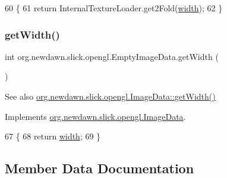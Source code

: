 \begin{DoxyCode}
60                              \{
61         \textcolor{keywordflow}{return} InternalTextureLoader.get2Fold(\mbox{\hyperlink{classorg_1_1newdawn_1_1slick_1_1opengl_1_1_empty_image_data_a0db414de2bae9de9483a7f3481c48b5e}{width}});
62     \}
\end{DoxyCode}
\mbox{\label{classorg_1_1newdawn_1_1slick_1_1opengl_1_1_empty_image_data_af376226fa31451e5ebab8d5570ced40e}} 
\subsubsection{\texorpdfstring{get\+Width()}{getWidth()}}
{\footnotesize\ttfamily int org.\+newdawn.\+slick.\+opengl.\+Empty\+Image\+Data.\+get\+Width (\begin{DoxyParamCaption}{ }\end{DoxyParamCaption})\hspace{0.3cm}{\ttfamily [inline]}}

\begin{DoxySeeAlso}{See also}
\mbox{\hyperlink{interfaceorg_1_1newdawn_1_1slick_1_1opengl_1_1_image_data_a59fd53f0ca1e501de35c1b2b4a7e69c5}{org.\+newdawn.\+slick.\+opengl.\+Image\+Data\+::get\+Width()}} 
\end{DoxySeeAlso}


Implements \mbox{\hyperlink{interfaceorg_1_1newdawn_1_1slick_1_1opengl_1_1_image_data_a59fd53f0ca1e501de35c1b2b4a7e69c5}{org.\+newdawn.\+slick.\+opengl.\+Image\+Data}}.


\begin{DoxyCode}
67                           \{
68         \textcolor{keywordflow}{return} \mbox{\hyperlink{classorg_1_1newdawn_1_1slick_1_1opengl_1_1_empty_image_data_a0db414de2bae9de9483a7f3481c48b5e}{width}};
69     \}
\end{DoxyCode}


\subsection{Member Data Documentation}
\mbox{\label{classorg_1_1newdawn_1_1slick_1_1opengl_1_1_empty_image_data_a190ee87309a0084066aad436a0fc267c}} 
